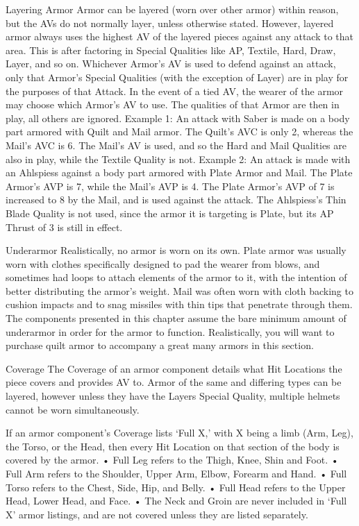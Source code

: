 \documentclass[oneside,11pt,english]{book}
\begin{document}
Layering Armor
Armor can be layered (worn over other armor) within reason, but the AVs do not normally layer, unless otherwise 
stated. However, layered armor always uses the highest AV of the layered pieces against any attack to that area. This is
after factoring in Special Qualities like AP, Textile, Hard, Draw, Layer, and so on. 
Whichever Armor’s AV is used to defend against an attack, only that Armor’s Special Qualities (with the exception of 
Layer) are in play for the purposes of that Attack. In the event of a tied AV, the wearer of the armor may choose which 
Armor’s AV to use. The qualities of that Armor are then in play, all others are ignored.
Example 1: An attack with Saber is made on a body part armored with Quilt and Mail armor. The Quilt’s AVC is only 
2, whereas the Mail’s AVC is 6. The Mail’s AV is used, and so the Hard and Mail Qualities are also in play, while the 
Textile Quality is not.
Example 2: An attack is made with an Ahlspiess against a body part armored with Plate Armor and Mail. The Plate 
Armor’s AVP is 7, while the Mail’s AVP is 4. The Plate Armor’s AVP of 7 is increased to 8 by the Mail, and is used 
against the attack. The Ahlspiess’s Thin Blade Quality is not used, since the armor it is targeting is Plate, but its AP 
Thrust of 3 is still in effect.

Underarmor
Realistically, no armor is worn on its own. Plate armor was usually worn with clothes specifically designed to pad the 
wearer from blows, and sometimes had loops to attach elements of the armor to it, with the intention of better 
distributing the armor’s weight. Mail was often worn with cloth backing to cushion impacts and to snag missiles with 
thin tips that penetrate through them.
The components presented in this chapter assume the bare minimum amount of underarmor in order for the armor to 
function. Realistically, you will want to purchase quilt armor to accompany a great many armors in this section.

Coverage
The Coverage of an armor component details what Hit Locations the piece covers and provides AV to. Armor of the 
same and differing types can be layered, however unless they have the Layers Special Quality, multiple helmets 
cannot be worn simultaneously.


If an armor component’s Coverage lists ‘Full X,’ with X being a limb (Arm, Leg), the Torso, or the Head, then every 
Hit Location on that section of the body is covered by the armor. 
• Full Leg refers to the Thigh, Knee, Shin and Foot. 
• Full Arm refers to the Shoulder, Upper Arm, Elbow, Forearm and Hand. 
• Full Torso refers to the Chest, Side, Hip, and Belly. 
• Full Head refers to the Upper Head, Lower Head, and Face. 
• The Neck and Groin are never included in ‘Full X’ armor listings, and are not covered unless they are listed 
separately.
\end{document}
